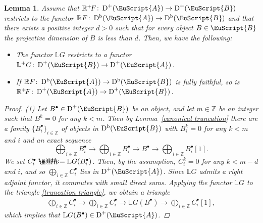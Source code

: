 \documentclass[10pt,a4paper]{amsart}
\makeatletter
\newtheorem{lem}[dfn]{Lemma}
\newcommand*{\defeq}{\mathrel{\rlap{%
 \raisebox{0.3ex}{$\m@th\cdot$}}%
 \raisebox{-0.3ex}{$\m@th\cdot$}}%
 =}
\numberwithin{equation}{section}
\newcommand{\Db}{\operatorname{D^b}}
\newcommand{\D}{\operatorname{D}}
\newcommand{\bL}{\mathbb{L}}
\newcommand{\bR}{\mathbb{R}}
\newcommand{\bZ}{\mathbb{Z}}
\newcommand{\scrA}{\EuScript{A}}
\newcommand{\scrB}{\EuScript{B}}
\makeatother
\begin{document}
\begin{lem}\label{above ff}
 Assume that $\bR^+\!F\colon \D^+(\scrA)\to \D^+(\scrB)$ restricts to the functor $\bR F\colon \Db(\scrA)\to\Db(\scrB)$ and that there exists a positive integer $d>0$ such that for every object $B\in \scrB$ the projective dimension of $B$ is less than $d$.
 Then, we have the following:
 \begin{itemize}\itemsep=0pt
 \item[$1.$] The functor $\bL G$ restricts to a functor $\bL^{+}G\colon \D^+(\scrB)\to \D^+(\scrA)$.
 \item[$2.$] If $\bR F\colon \Db(\scrA)\to\Db(\scrB)$ is fully faithful, so is $\bR^+\!F\colon \D^+(\scrA)\to \D^+(\scrB)$.
 \end{itemize}
\begin{proof}
(1)
Let $B^{\bullet}\in \D^+(\scrB)$ be an object, and let $m\in\bZ$ be an integer such that $B^k=0$ for any $k<m$. Then by Lemma~\ref{canonical truncation} there are a family $\{B^{\bullet}_i\}_{i\in\bZ}$ of objects in $\Db(\scrB)$ with $B_i^k=0$ for any $k<m$ and $i$ and an exact sequence
\begin{equation}\label{truncation triangle}
\bigoplus_{i\in \bZ}B^{\bullet}_i\to \bigoplus_{i\in \bZ}B^{\bullet}_i\to B^{\bullet}\to \bigoplus_{i\in \bZ}B^{\bullet}_i[1].
\end{equation}
We set $C_i^{\bullet}\defeq\bL G(B^{\bullet}_i)$. Then, by the assumption, $C_i^{k}=0$ for any $k<m-d$ and $i$, and so $\bigoplus_{i\in \bZ}C_i^{\bullet}$ lies in $\D^+(\scrA)$.
Since $\bL G$ admits a right adjoint functor, it commutes with small direct sums.
Applying the functor $\bL G$ to the triangle \eqref{truncation triangle}, we obtain a triangle
\begin{gather*}
\bigoplus_{i\in \bZ}C^{\bullet}_i\to \bigoplus_{i\in \bZ}C^{\bullet}_i\to \bL G(B^{\bullet})\to \bigoplus_{i\in \bZ}C^{\bullet}_i[1],
\end{gather*}
which implies that $\bL G(B^{\bullet})\in\D^+(\scrA)$.



\end{proof}
\end{lem}
\end{document}
